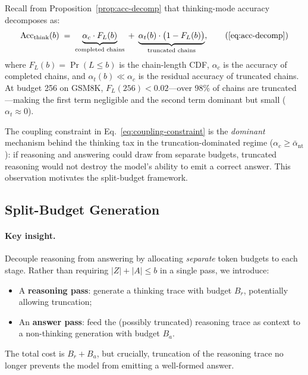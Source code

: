 Recall from Proposition~\ref{prop:acc-decomp} that thinking-mode accuracy
decomposes as:
\begin{equation}
  \mathrm{Acc}_{\mathrm{think}}(b)
  \;=\; \underbrace{\alpha_c \cdot F_L(b)}_{\text{completed chains}}
  \;+\; \underbrace{\alpha_t(b) \cdot \bigl(1 - F_L(b)\bigr)}_{\text{truncated chains}},
  \tag{\ref{eq:acc-decomp}}
\end{equation}
where $F_L(b) = \Pr(L \le b)$ is the chain-length CDF, $\alpha_c$ is the
accuracy of completed chains, and $\alpha_t(b) \ll \alpha_c$ is the
residual accuracy of truncated chains.
At budget 256 on GSM8K, $F_L(256) < 0.02$---over 98\% of chains are
truncated---making the first term negligible and the second term dominant
but small ($\alpha_t \approx 0$).

The coupling constraint in Eq.~\eqref{eq:coupling-constraint} is the
\emph{dominant} mechanism behind the thinking tax in the
truncation-dominated regime ($\alpha_c \ge \bar{\alpha}_{\mathrm{nt}}$):
if reasoning and answering could draw from separate budgets, truncated
reasoning would not destroy the model's ability to emit a correct answer.
This observation motivates the split-budget framework.

\subsection{Split-Budget Generation}
\label{sec:method:split}

\paragraph{Key insight.}
Decouple reasoning from answering by allocating \emph{separate} token
budgets to each stage.
Rather than requiring $|Z| + |A| \le b$ in a single pass, we introduce:
\begin{itemize}[nosep,leftmargin=*]
  \item A \textbf{reasoning pass}: generate a thinking trace with budget $B_r$,
    potentially allowing truncation;
  \item An \textbf{answer pass}: feed the (possibly truncated) reasoning
    trace as context to a non-thinking generation with budget $B_a$.
\end{itemize}
The total cost is $B_r + B_a$, but crucially, truncation of the reasoning
trace no longer prevents the model from emitting a well-formed answer.

